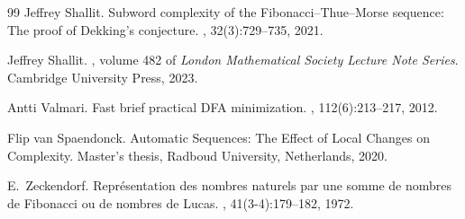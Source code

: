 \documentclass[12pt,reqno]{article}
\begin{document}
\begin{thebibliography}{99}
Jeffrey Shallit.
\newblock Subword complexity of the {Fibonacci}–{Thue}–{Morse} sequence:
  The proof of {Dekking}’s conjecture.
, 32(3):729--735, 2021.

Jeffrey Shallit.
, volume 482 of {\em London
  {Mathematical} {Society} {Lecture} {Note} {Series}}.
\newblock Cambridge University Press, 2023.

Antti Valmari.
\newblock Fast brief practical {DFA} minimization.
, 112(6):213--217, 2012.

Flip van Spaendonck.
\newblock Automatic {Sequences}: {The} {Effect} of {Local} {Changes} on
  {Complexity}.
\newblock Master's thesis, Radboud University, Netherlands, 2020.

E.~Zeckendorf.
\newblock Repr{\'e}sentation des nombres naturels par une somme de nombres de
  {Fibonacci} ou de nombres de {Lucas}.
, 41(3-4):179--182, 1972.

\end{thebibliography}
\end{document}
